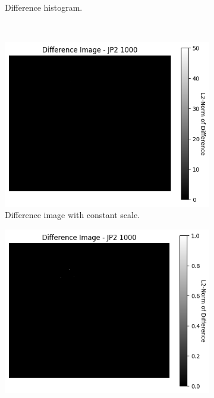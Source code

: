 \begin{figure}[htb]
\begin{subfigure}[b]{0.48\textwidth}
        \caption{Difference histogram.}
        \label{fig:img_quality_comp_jp2_1000_histo}
    \end{subfigure}
    \\
    \begin{subfigure}[b]{0.48\textwidth}
        \centering
        \includegraphics[width=\textwidth]{doc/thesis/0_figures/compare_quality/set1/jp2_1000_diff_heatmap.png}
        \caption{Difference image with constant scale.}
        \label{fig:img_quality_comp_jp2_1000_diff}
    \end{subfigure}
    \begin{subfigure}[b]{0.48\textwidth}
        \centering
        \includegraphics[width=\textwidth]{doc/thesis/0_figures/compare_quality/set1/jp2_1000_diff_heatmap_rel.png}

\end{subfigure}
\end{figure}
